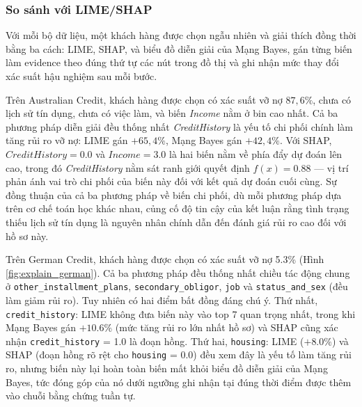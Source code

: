 \subsubsection{So sánh với LIME/SHAP}
\noindent
Với mỗi bộ dữ liệu, một khách hàng được chọn ngẫu nhiên và giải thích đồng thời bằng ba cách: LIME, SHAP, và biểu đồ diễn giải của Mạng Bayes, gán từng biến làm evidence theo đúng thứ tự các nút trong đồ thị và ghi nhận mức thay đổi xác suất hậu nghiệm sau mỗi bước.

Trên Australian Credit, khách hàng được chọn có xác suất vỡ nợ $87,6\%$, chưa có lịch sử tín dụng, chưa có việc làm, và biến \textit{Income} nằm ở bin cao nhất. Cả ba phương pháp diễn giải đều thống nhất \textit{CreditHistory} là yếu tố chi phối chính làm tăng rủi ro vỡ nợ: LIME gán $+65,4\%$, Mạng Bayes gán $+42,4\%$. Với SHAP, $\textit{CreditHistory} = 0.0$ và $\textit{Income} = 3.0$ là hai biến nằm về phía đẩy dự đoán lên cao, trong đó \textit{CreditHistory} nằm sát ranh giới quyết định $f(x) = 0.88$ — vị trí phản ánh vai trò chi phối của biến này đối với kết quả dự đoán cuối cùng. Sự đồng thuận của cả ba phương pháp về biến chi phối, dù mỗi phương pháp dựa trên cơ chế toán học khác nhau, củng cố độ tin cậy của kết luận rằng tình trạng thiếu lịch sử tín dụng là nguyên nhân chính dẫn đến đánh giá rủi ro cao đối với hồ sơ này.

Trên German Credit, khách hàng được chọn có xác suất vỡ nợ 5.3\% (Hình \ref{fig:explain_german}). Cả ba phương pháp đều thống nhất chiều tác động chung ở \texttt{other\_installment\_plans}, \texttt{secondary\_obligor}, \texttt{job} và \texttt{status\_and\_sex} (đều làm giảm rủi ro). Tuy nhiên có hai điểm bất đồng đáng chú ý. Thứ nhất, \texttt{credit\_history}: LIME không đưa biến này vào top 7 quan trọng nhất, trong khi Mạng Bayes gán $+10.6\%$ (mức tăng rủi ro lớn nhất hồ sơ) và SHAP cũng xác nhận \texttt{credit\_history} = 1.0 là đoạn hồng. Thứ hai, \texttt{housing}: LIME ($+8.0\%$) và SHAP (đoạn hồng rõ rệt cho \texttt{housing} = 0.0) đều xem đây là yếu tố làm tăng rủi ro, nhưng biến này lại hoàn toàn biến mất khỏi biểu đồ diễn giải của Mạng Bayes, tức đóng góp của nó dưới ngưỡng ghi nhận tại đúng thời điểm được thêm vào chuỗi bằng chứng tuần tự.

